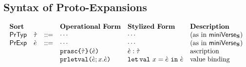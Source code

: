 \subsection{Syntax of Proto-Expansions}
\[\begin{array}{lllllll}
\textbf{Sort} & & & \textbf{Operational Form} & \textbf{Stylized Form} & \textbf{Description}\\
\mathsf{PrTyp} & \grave{\tau} & ::= & \cdots & \cdots & \text{(as in $\mathsf{miniVerse}_\textbf{S}$)}\\
\mathsf{PrExp} & \grave{e} & ::= & \cdots & \cdots & \text{(as in $\mathsf{miniVerse}_\textbf{S}$)}\\
&&& \texttt{prasc}\texttt{\{}\grave{\tau}\texttt{\}(}\grave{e}\texttt{)} & \grave{e} : \grave{\tau} & \text{ascription}\\
&&& \texttt{prletval}\texttt{(}\grave{e}; x.\grave{e}\texttt{)} & \texttt{let\,val}~x=\grave{e}~\texttt{in}~\grave{e} & \text{value binding}\\

\end{array}\]
